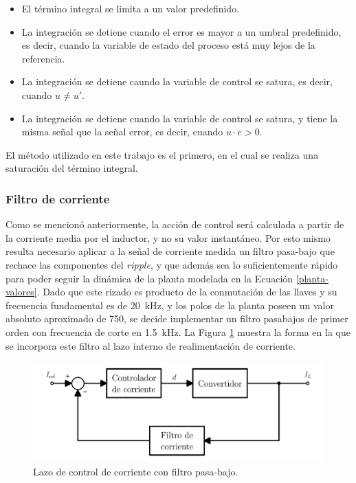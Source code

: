 \begin{itemize}
  \item El término integral se limita a un valor predefinido.
  \item La integración se detiene cuando el error es mayor a un umbral predefinido, es decir, cuando la variable de estado del proceso está muy lejos de la referencia.
  \item La integración se detiene caundo la variable de control se satura, es decir, cuando $u \neq u'$.
  \item La integración se detiene cuando la variable de control se satura, y tiene la misma señal que la señal error, es decir, cuando $u \cdot e > 0$.
\end{itemize}

El método utilizado en este trabajo es el primero, en el cual se realiza una saturación del término integral.

\subsubsection{Filtro de corriente}
\label{diseno-filtro-corriente}

Como se mencionó anteriormente, la acción de control será calculada a partir de la corriente media por el inductor, y no su valor instantáneo. Por esto mismo resulta necesario aplicar a la señal de corriente medida un filtro pasa-bajo que rechace las componentes del \emph{ripple}, y que además sea lo suficientemente rápido para poder seguir la dinámica de la planta modelada en la Ecuación \ref{planta-valores}. Dado que este rizado es producto de la conmutación de las llaves y su frecuencia fundamental es de \SI{20}{\kilo\hertz}, y los polos de la planta poseen un valor absoluto aproximado de 750, se decide implementar un filtro pasabajos de primer orden con frecuencia de corte en \SI{1.5}{\kilo\hertz}. La Figura \ref{filtro-corriente} muestra la forma en la que se incorpora este filtro al lazo interno de realimentación de corriente.

\begin{figure}[hbt!]
  \centering
  \includegraphics[width=0.65\columnwidth]{Imágenes/Diseño del control/Lazo de control de corriente con filtro.pdf}
  \caption{Lazo de control de corriente con filtro pasa-bajo.}
  \label{filtro-corriente}
\end{figure} 

